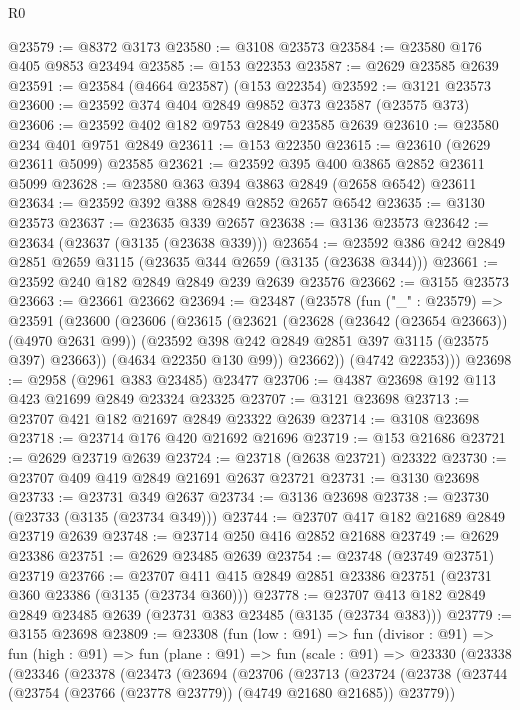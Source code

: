 \begin{lexlean}{R0}
\begin{coremodule}
@23579 := @8372 @3173
@23580 := @3108 @23573
@23584 := @23580 @176 @405 @9853 @23494
@23585 := @153 @22353
@23587 := @2629 @23585 @2639
@23591 := @23584 (@4664 @23587) (@153 @22354)
@23592 := @3121 @23573
@23600 := @23592 @374 @404 @2849 @9852 @373 @23587 (@23575 @373)
@23606 := @23592 @402 @182 @9753 @2849 @23585 @2639
@23610 := @23580 @234 @401 @9751 @2849
@23611 := @153 @22350
@23615 := @23610 (@2629 @23611 @5099) @23585
@23621 := @23592 @395 @400 @3865 @2852 @23611 @5099
@23628 := @23580 @363 @394 @3863 @2849 (@2658 @6542) @23611
@23634 := @23592 @392 @388 @2849 @2852 @2657 @6542
@23635 := @3130 @23573
@23637 := @23635 @339 @2657
@23638 := @3136 @23573
@23642 := @23634 (@23637 (@3135 (@23638 @339)))
@23654 := @23592 @386 @242 @2849 @2851 @2659 @3115 (@23635 @344 @2659 (@3135 (@23638 @344)))
@23661 := @23592 @240 @182 @2849 @2849 @239 @2639 @23576
@23662 := @3155 @23573
@23663 := @23661 @23662
@23694 := @23487
    (@23578
      (fun ("_" : @23579) =>
      @23591
        (@23600
          (@23606
            (@23615
              (@23621
                (@23628 (@23642 (@23654 @23663)) (@4970 @2631 @99))
                (@23592 @398 @242 @2849 @2851 @397 @3115 (@23575 @397) @23663))
              (@4634 @22350 @130 @99))
            @23662))
        (@4742 @22353)))
@23698 := @2958 (@2961 @383 @23485) @23477
@23706 := @4387 @23698 @192 @113 @423 @21699 @2849 @23324 @23325
@23707 := @3121 @23698
@23713 := @23707 @421 @182 @21697 @2849 @23322 @2639
@23714 := @3108 @23698
@23718 := @23714 @176 @420 @21692 @21696
@23719 := @153 @21686
@23721 := @2629 @23719 @2639
@23724 := @23718 (@2638 @23721) @23322
@23730 := @23707 @409 @419 @2849 @21691 @2637 @23721
@23731 := @3130 @23698
@23733 := @23731 @349 @2637
@23734 := @3136 @23698
@23738 := @23730 (@23733 (@3135 (@23734 @349)))
@23744 := @23707 @417 @182 @21689 @2849 @23719 @2639
@23748 := @23714 @250 @416 @2852 @21688
@23749 := @2629 @23386
@23751 := @2629 @23485 @2639
@23754 := @23748 (@23749 @23751) @23719
@23766 := @23707 @411 @415 @2849 @2851 @23386 @23751 (@23731 @360 @23386 (@3135 (@23734 @360)))
@23778 := @23707 @413 @182 @2849 @2849 @23485 @2639 (@23731 @383 @23485 (@3135 (@23734 @383)))
@23779 := @3155 @23698
@23809 := @23308
    (fun (low : @91) =>
    fun (divisor : @91) =>
    fun (high : @91) =>
    fun (plane : @91) =>
    fun (scale : @91) =>
    @23330
      (@23338
        (@23346
          (@23378
            (@23473
              (@23694
                (@23706
                  (@23713
                    (@23724
                      (@23738
                        (@23744 (@23754 (@23766 (@23778 @23779)) (@4749 @21680 @21685)) @23779))

\end{coremodule}
\end{lexlean}
